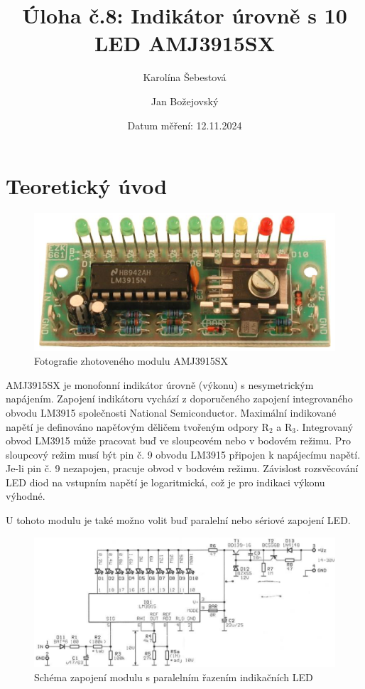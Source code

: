 \documentclass[a4paper, czech]{article}
\title{Úloha č.8: Indikátor úrovně s 10 LED AMJ3915SX}
\author{Karolína Šebestová \and Jan Božejovský}
\date{Datum měření: 12.11.2024}
\begin{document}
\maketitle

\section{Teoretický úvod}

\begin{figure}[H]
    \centering
    \includegraphics{amj3915sx_foto.png}
    \caption{Fotografie zhotoveného modulu AMJ3915SX}
\end{figure}

AMJ3915SX je monofonní indikátor úrovně (výkonu) s nesymetrickým napájením.
Zapojení indikátoru vychází z doporučeného zapojení integrovaného obvodu LM3915 společnosti National Semiconductor.
Maximální indikované napětí je definováno napěťovým děličem tvořeným odpory R$_2$ a R$_3$.
Integrovaný obvod LM3915 může pracovat buď ve sloupcovém nebo v bodovém režimu.
Pro sloupcový režim musí být pin č. 9 obvodu LM3915 připojen k napájecímu napětí.
Je-li pin č. 9 nezapojen, pracuje obvod v bodovém režimu.
Závislost rozsvěcování LED diod na vstupním napětí je logaritmická, což je pro indikaci výkonu výhodné.

U tohoto modulu je také možno volit buď paralelní nebo sériové zapojení LED.

\begin{figure}[H]
    \centering
    \includegraphics[width=\textwidth]{amj3915sx_schema_paralelni.png}
    \caption{Schéma zapojení modulu s paralelním řazením indikačních LED}
\end{figure}
\end{document}
